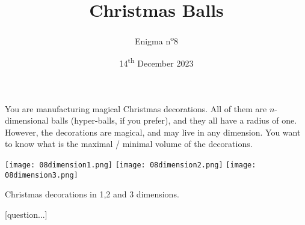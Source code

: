 \documentclass[a4paper, top=10mm]{article}
\title{\textbf{\huge{Christmas Balls}}}
\author{Enigma n\textsuperscript{o}8}
\date{14\textsuperscript{th} December 2023}
\begin{document}
	\maketitle
	
	You are manufacturing magical Christmas decorations.
	All of them  are $n$-dimensional balls (hyper-balls, if you prefer), and they all have a radius of one.
	However, the decorations are magical, and may live in any dimension.
	You want to know what is the maximal / minimal volume of the decorations.
	
	\begin{center}
		\texttt{[image: 08dimension1.png]}	\texttt{[image: 08dimension2.png]}		\texttt{[image: 08dimension3.png]}
		
		Christmas decorations in 1,2 and 3 dimensions.
	\end{center}
	
	[question...]
	
\end{document}
